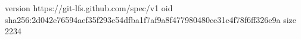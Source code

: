 version https://git-lfs.github.com/spec/v1
oid sha256:2d042e76594aef35f293c54dfba1f7af9a8f477980480ce31c4f78f6ff326e9a
size 2234

